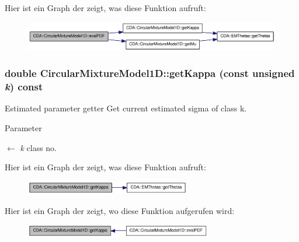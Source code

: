 Hier ist ein Graph der zeigt, was diese Funktion aufruft:\nopagebreak
\begin{figure}[H]
\begin{center}
\leavevmode
\includegraphics[width=317pt]{classCDA_1_1CircularMixtureModel1D_a975b92938beb21d0233e5a52ff017dc5_cgraph}
\end{center}
\end{figure}


\hypertarget{classCDA_1_1CircularMixtureModel1D_a1e29228c5ebe57babcf4857991b36a47}{
\subsubsection[{getKappa}]{\setlength{\rightskip}{0pt plus 5cm}double CircularMixtureModel1D::getKappa (const unsigned {\em k}) const}}
\label{classCDA_1_1CircularMixtureModel1D_a1e29228c5ebe57babcf4857991b36a47}


Estimated parameter getter Get current estimated sigma of class k. 


\begin{DoxyParams}{Parameter}
\item[\mbox{$\leftarrow$} {\em k}]class no. \end{DoxyParams}


Hier ist ein Graph der zeigt, was diese Funktion aufruft:\nopagebreak
\begin{figure}[H]
\begin{center}
\leavevmode
\includegraphics[width=204pt]{classCDA_1_1CircularMixtureModel1D_a1e29228c5ebe57babcf4857991b36a47_cgraph}
\end{center}
\end{figure}




Hier ist ein Graph der zeigt, wo diese Funktion aufgerufen wird:\nopagebreak
\begin{figure}[H]
\begin{center}
\leavevmode
\includegraphics[width=231pt]{classCDA_1_1CircularMixtureModel1D_a1e29228c5ebe57babcf4857991b36a47_icgraph}
\end{center}
\end{figure}


